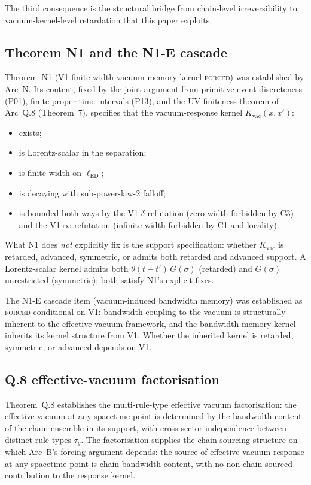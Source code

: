 \documentclass[11pt,a4paper]{article}
\begin{document}
The third consequence is the structural bridge from chain-level irreversibility to vacuum-kernel-level retardation that this paper exploits.

\subsection{Theorem N1 and the N1-E cascade}

Theorem~N1 (V1 finite-width vacuum memory kernel \textsc{forced}) was established by Arc~N. Its content, fixed by the joint argument from primitive event-discreteness (P01), finite proper-time intervals (P13), and the UV-finiteness theorem of Arc~Q.8 (Theorem~7), specifies that the vacuum-response kernel $K_\mathrm{vac}(x,x')$:
\begin{itemize}[leftmargin=1.5em]
  \item exists;
  \item is Lorentz-scalar in the separation;
  \item is finite-width on $\ell_\mathrm{ED}$;
  \item is decaying with sub-power-law-2 falloff;
  \item is bounded both ways by the V1-$\delta$ refutation (zero-width forbidden by C3) and the V1-$\infty$ refutation (infinite-width forbidden by C1 and locality).
\end{itemize}

What N1 does \emph{not} explicitly fix is the support specification: whether $K_\mathrm{vac}$ is retarded, advanced, symmetric, or admits both retarded and advanced support. A Lorentz-scalar kernel admits both $\theta(t-t')\,G(\sigma)$ (retarded) and $G(\sigma)$ unrestricted (symmetric); both satisfy N1's explicit fixes.

The N1-E cascade item (vacuum-induced bandwidth memory) was established as \textsc{forced}-conditional-on-V1: bandwidth-coupling to the vacuum is structurally inherent to the effective-vacuum framework, and the bandwidth-memory kernel inherits its kernel structure from V1. Whether the inherited kernel is retarded, symmetric, or advanced depends on V1.

\subsection{Q.8 effective-vacuum factorisation}

Theorem~Q.8 establishes the multi-rule-type effective vacuum factorisation: the effective vacuum at any spacetime point is determined by the bandwidth content of the chain ensemble in its support, with cross-sector independence between distinct rule-types $\tau_g$. The factorisation supplies the chain-sourcing structure on which Arc~B's forcing argument depends: the source of effective-vacuum response at any spacetime point is chain bandwidth content, with no non-chain-sourced contribution to the response kernel.
\end{document}
